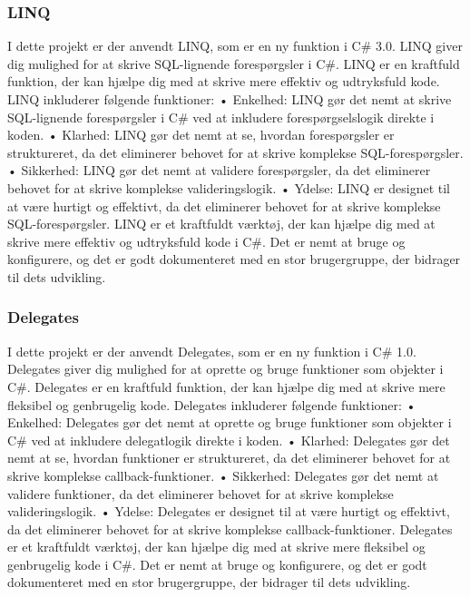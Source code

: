 \subsubsection{LINQ}
I dette projekt er der anvendt LINQ, som er en ny funktion i C\# 3.0. LINQ giver dig mulighed for at skrive SQL-lignende forespørgsler i C\#. LINQ er en kraftfuld funktion, der kan hjælpe dig med at skrive mere effektiv og udtryksfuld kode.
LINQ inkluderer følgende funktioner:
•	Enkelhed: LINQ gør det nemt at skrive SQL-lignende forespørgsler i C\# ved at inkludere forespørgselslogik direkte i koden.
•	Klarhed: LINQ gør det nemt at se, hvordan forespørgsler er struktureret, da det eliminerer behovet for at skrive komplekse SQL-forespørgsler.
•	Sikkerhed: LINQ gør det nemt at validere forespørgsler, da det eliminerer behovet for at skrive komplekse valideringslogik.
•	Ydelse: LINQ er designet til at være hurtigt og effektivt, da det eliminerer behovet for at skrive komplekse SQL-forespørgsler.
LINQ er et kraftfuldt værktøj, der kan hjælpe dig med at skrive mere effektiv og udtryksfuld kode i C\#. Det er nemt at bruge og konfigurere, og det er godt dokumenteret med en stor brugergruppe, der bidrager til dets udvikling.

\subsubsection{Delegates}
I dette projekt er der anvendt Delegates, som er en ny funktion i C\# 1.0. Delegates giver dig mulighed for at oprette og bruge funktioner som objekter i C\#. Delegates er en kraftfuld funktion, der kan hjælpe dig med at skrive mere fleksibel og genbrugelig kode.
Delegates inkluderer følgende funktioner:
•	Enkelhed: Delegates gør det nemt at oprette og bruge funktioner som objekter i C\# ved at inkludere delegatlogik direkte i koden.
•	Klarhed: Delegates gør det nemt at se, hvordan funktioner er struktureret, da det eliminerer behovet for at skrive komplekse callback-funktioner.
•	Sikkerhed: Delegates gør det nemt at validere funktioner, da det eliminerer behovet for at skrive komplekse valideringslogik.
•	Ydelse: Delegates er designet til at være hurtigt og effektivt, da det eliminerer behovet for at skrive komplekse callback-funktioner.
Delegates er et kraftfuldt værktøj, der kan hjælpe dig med at skrive mere fleksibel og genbrugelig kode i C\#. Det er nemt at bruge og konfigurere, og det er godt dokumenteret med en stor brugergruppe, der bidrager til dets udvikling.

